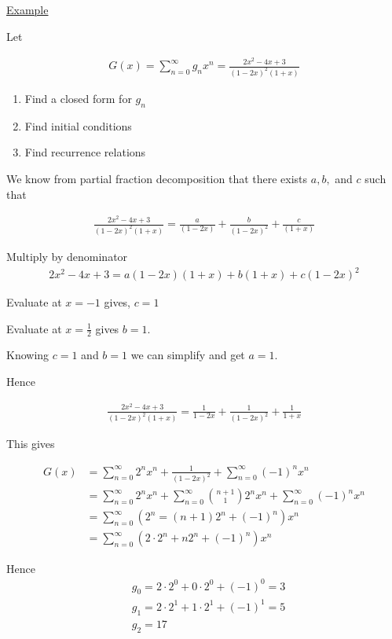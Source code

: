 \documentclass{article}
\begin{document}
\underline{Example}

Let

\begin{align*}
    G(x) = \sum_{n=0}^{\infty}g_nx^n = \frac{2x^2-4x+3}{(1-2x)^2(1+x)}
\end{align*}

\begin{enumerate}
    \item Find a closed form for $g_n$
    \item Find initial conditions
    \item Find recurrence relations
\end{enumerate}

We know from partial fraction decomposition that there exists $a,b,$ and $c$ such that

\begin{align*}
    \frac{2x^2-4x+3}{(1-2x)^2(1+x)} = \frac{a}{(1-2x)} + \frac{b}{(1-2x)^2} + \frac{c}{(1+x)}
\end{align*}

Multiply by denominator
\begin{align*}
    2x^2 - 4x + 3 = a(1-2x)(1+x) + b(1+x) + c(1-2x)^2
\end{align*}

Evaluate at $x=-1$ gives, $c=1$

Evaluate at $x= \frac{1}{2}$ gives $b = 1$.

Knowing $c=1$ and $b=1$ we can simplify and get $a=1$.

Hence

\begin{align*}
    \frac{2x^2-4x+3}{(1-2x)^2(1+x)} = \frac{1}{1-2x} + \frac{1}{(1-2x)^2} + \frac{1}{1+x}
\end{align*}

This gives

\begin{align*}
    G(x) &= \sum_{n=0}^{\infty}2^nx^n + \frac{1}{(1-2x)^2} + \sum_{n=0}^{\infty}(-1)^nx^n \\
    &= \sum_{n=0}^{\infty}2^nx^n + \sum_{n=0}^{\infty}\binom{n+1}{1}2^nx^n + \sum_{n=0}^{\infty}(-1)^nx^n \\
    &= \sum_{n=0}^{\infty}(2^n = (n+1)2^n + (-1)^n)x^n \\
    &= \sum_{n=0}^{\infty}(2 \cdot 2^n + n2^n + (-1)^n)x^n
\end{align*}

Hence 
\begin{align*}
    &g_0 = 2 \cdot 2^0 + 0 \cdot 2^0 + (-1)^0 = 3 \\ 
    &g_1 = 2 \cdot 2^1 + 1 \cdot 2^1 + (-1)^1 = 5 \\
    &g_2 = 17
\end{align*}
\end{document}
